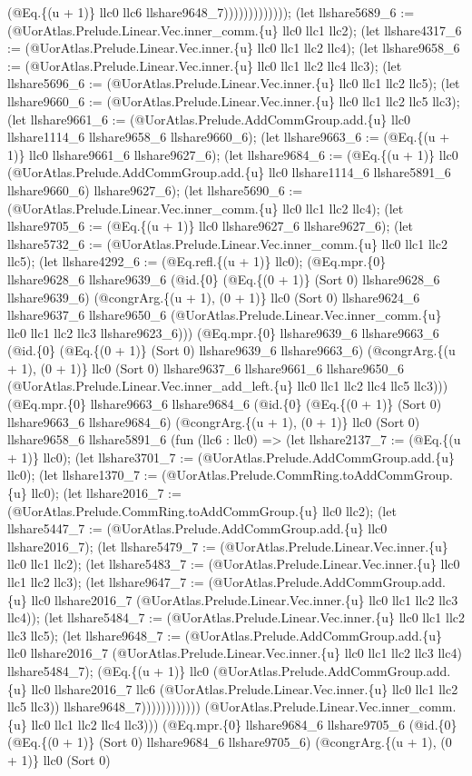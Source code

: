 \documentclass[11pt]{article}
\begin{document}
(@Eq.\{(u + 1)\} llc0 llc6 llshare9648\_7))))))))))))); (let llshare5689\_6 := (@UorAtlas.Prelude.Linear.Vec.inner\_comm.\{u\} llc0 llc1 llc2); (let llshare4317\_6 := (@UorAtlas.Prelude.Linear.Vec.inner.\{u\} llc0 llc1 llc2 llc4); (let llshare9658\_6 := (@UorAtlas.Prelude.Linear.Vec.inner.\{u\} llc0 llc1 llc2 llc4 llc3); (let llshare5696\_6 := (@UorAtlas.Prelude.Linear.Vec.inner.\{u\} llc0 llc1 llc2 llc5); (let llshare9660\_6 := (@UorAtlas.Prelude.Linear.Vec.inner.\{u\} llc0 llc1 llc2 llc5 llc3); (let llshare9661\_6 := (@UorAtlas.Prelude.AddCommGroup.add.\{u\} llc0 llshare1114\_6 llshare9658\_6 llshare9660\_6); (let llshare9663\_6 := (@Eq.\{(u + 1)\} llc0 llshare9661\_6 llshare9627\_6); (let llshare9684\_6 := (@Eq.\{(u + 1)\} llc0 (@UorAtlas.Prelude.AddCommGroup.add.\{u\} llc0 llshare1114\_6 llshare5891\_6 llshare9660\_6) llshare9627\_6); (let llshare5690\_6 := (@UorAtlas.Prelude.Linear.Vec.inner\_comm.\{u\} llc0 llc1 llc2 llc4); (let llshare9705\_6 := (@Eq.\{(u + 1)\} llc0 llshare9627\_6 llshare9627\_6); (let llshare5732\_6 := (@UorAtlas.Prelude.Linear.Vec.inner\_comm.\{u\} llc0 llc1 llc2 llc5); (let llshare4292\_6 := (@Eq.refl.\{(u + 1)\} llc0); (@Eq.mpr.\{0\} llshare9628\_6 llshare9639\_6 (@id.\{0\} (@Eq.\{(0 + 1)\} (Sort 0) llshare9628\_6 llshare9639\_6) (@congrArg.\{(u + 1), (0 + 1)\} llc0 (Sort 0) llshare9624\_6 llshare9637\_6 llshare9650\_6 (@UorAtlas.Prelude.Linear.Vec.inner\_comm.\{u\} llc0 llc1 llc2 llc3 llshare9623\_6))) (@Eq.mpr.\{0\} llshare9639\_6 llshare9663\_6 (@id.\{0\} (@Eq.\{(0 + 1)\} (Sort 0) llshare9639\_6 llshare9663\_6) (@congrArg.\{(u + 1), (0 + 1)\} llc0 (Sort 0) llshare9637\_6 llshare9661\_6 llshare9650\_6 (@UorAtlas.Prelude.Linear.Vec.inner\_add\_left.\{u\} llc0 llc1 llc2 llc4 llc5 llc3))) (@Eq.mpr.\{0\} llshare9663\_6 llshare9684\_6 (@id.\{0\} (@Eq.\{(0 + 1)\} (Sort 0) llshare9663\_6 llshare9684\_6) (@congrArg.\{(u + 1), (0 + 1)\} llc0 (Sort 0) llshare9658\_6 llshare5891\_6 (fun (llc6 : llc0) => (let llshare2137\_7 := (@Eq.\{(u + 1)\} llc0); (let llshare3701\_7 := (@UorAtlas.Prelude.AddCommGroup.add.\{u\} llc0); (let llshare1370\_7 := (@UorAtlas.Prelude.CommRing.toAddCommGroup.\{u\} llc0); (let llshare2016\_7 := (@UorAtlas.Prelude.CommRing.toAddCommGroup.\{u\} llc0 llc2); (let llshare5447\_7 := (@UorAtlas.Prelude.AddCommGroup.add.\{u\} llc0 llshare2016\_7); (let llshare5479\_7 := (@UorAtlas.Prelude.Linear.Vec.inner.\{u\} llc0 llc1 llc2); (let llshare5483\_7 := (@UorAtlas.Prelude.Linear.Vec.inner.\{u\} llc0 llc1 llc2 llc3); (let llshare9647\_7 := (@UorAtlas.Prelude.AddCommGroup.add.\{u\} llc0 llshare2016\_7 (@UorAtlas.Prelude.Linear.Vec.inner.\{u\} llc0 llc1 llc2 llc3 llc4)); (let llshare5484\_7 := (@UorAtlas.Prelude.Linear.Vec.inner.\{u\} llc0 llc1 llc2 llc3 llc5); (let llshare9648\_7 := (@UorAtlas.Prelude.AddCommGroup.add.\{u\} llc0 llshare2016\_7 (@UorAtlas.Prelude.Linear.Vec.inner.\{u\} llc0 llc1 llc2 llc3 llc4) llshare5484\_7); (@Eq.\{(u + 1)\} llc0 (@UorAtlas.Prelude.AddCommGroup.add.\{u\} llc0 llshare2016\_7 llc6 (@UorAtlas.Prelude.Linear.Vec.inner.\{u\} llc0 llc1 llc2 llc5 llc3)) llshare9648\_7)))))))))))) (@UorAtlas.Prelude.Linear.Vec.inner\_comm.\{u\} llc0 llc1 llc2 llc4 llc3))) (@Eq.mpr.\{0\} llshare9684\_6 llshare9705\_6 (@id.\{0\} (@Eq.\{(0 + 1)\} (Sort 0) llshare9684\_6 llshare9705\_6) (@congrArg.\{(u + 1), (0 + 1)\} llc0 (Sort 0) 
\end{document}
